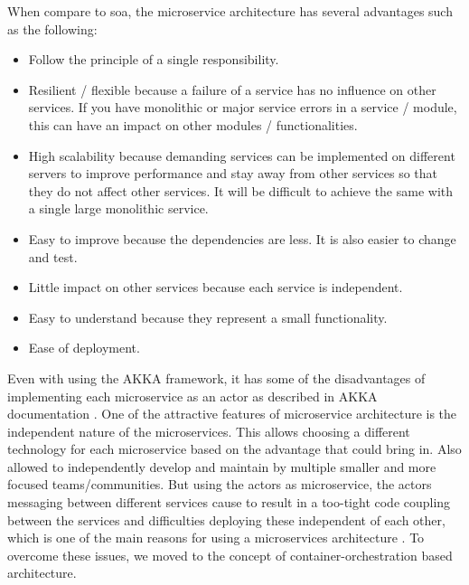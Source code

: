 When compare to \acrshort{soa}, the microservice architecture has several advantages such as the following:
\begin{itemize}
    \item Follow the principle of a single responsibility.
    \item Resilient / flexible because a failure of a service has no influence on other services. If you have monolithic or major service errors in a service / module, this can have an impact on other modules / functionalities.
    \item High scalability because demanding services can be implemented on different servers to improve performance and stay away from other services so that they do not affect other services. It will be difficult to achieve the same with a single large monolithic service.
    \item Easy to improve because the dependencies are less. It is also easier to change and test.
    \item Little impact on other services because each service is independent.
    \item Easy to understand because they represent a small functionality.
    \item Ease of deployment.
\end{itemize}


Even with using the AKKA framework, it has some of the disadvantages of implementing each microservice as an actor as described in AKKA documentation \cite{Akka.ioWhenCluster}. One of the attractive features of microservice architecture is the independent nature of the microservices. This allows choosing a different technology for each microservice based on the advantage that could bring in. Also allowed to independently develop and maintain by multiple smaller and more focused teams/communities. But using the actors as microservice, the actors messaging between different services cause to result in a too-tight code coupling between the services and difficulties deploying these independent of each other, which is one of the main reasons for using a microservices architecture \cite{Akka.ioWhenCluster}. To overcome these issues, we moved to the concept of container-orchestration based architecture.

